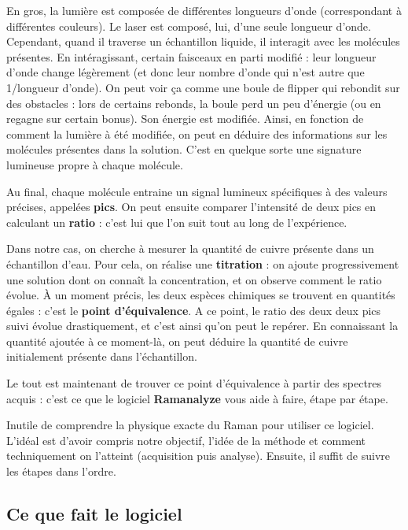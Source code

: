 \documentclass[12pt, a4paper]{article}
\begin{document}
En gros, la lumière est composée de différentes longueurs d'onde (correspondant à différentes couleurs).
Le laser est composé, lui,  d'une seule longueur d'onde. Cependant, quand il traverse un échantillon liquide, il interagit avec les molécules présentes.
En intéragissant, certain faisceaux en parti modifié : leur longueur d'onde change légèrement (et donc leur nombre d'onde qui n'est autre que 1/longueur d'onde).
On peut voir ça comme une boule de flipper qui rebondit sur des obstacles : lors de certains rebonds, la boule perd un peu d'énergie (ou en regagne sur certain bonus). Son énergie est modifiée. 
Ainsi, en fonction de comment la lumière à été modifiée, on peut en déduire des informations sur les molécules présentes dans la solution.
C'est en quelque sorte une signature lumineuse propre à chaque molécule.

Au final, chaque molécule entraine un signal lumineux spécifiques à des valeurs précises, appelées
\textbf{pics}. 
On peut ensuite comparer l'intensité de deux pics en calculant un
\textbf{ratio} : c'est lui que l'on suit tout au long de l'expérience.

Dans notre cas, on cherche à mesurer la quantité de cuivre présente dans
un échantillon d'eau. Pour cela, on réalise une \textbf{titration} : on
ajoute progressivement une solution dont on connaît la concentration, et on
observe comment le ratio évolue. À un moment précis, les deux espèces
chimiques se trouvent en quantités égales : c'est le \textbf{point
d'équivalence}. A ce point, le ratio des deux deux pics suivi évolue drastiquement, et c'est ainsi qu'on peut le repérer.
 En connaissant la quantité ajoutée à ce moment-là, on peut
déduire la quantité de cuivre initialement présente dans l'échantillon.

Le tout est maintenant de trouver ce point d'équivalence à partir des spectres acquis : c'est ce que le logiciel \textbf{Ramanalyze} vous aide à faire, étape par étape.

\begin{conseil}
  Inutile de comprendre la physique exacte du Raman pour utiliser ce logiciel.
  L'idéal est d'avoir compris notre objectif, l'idée de la méthode et comment techniquement on l'atteint (acquisition puis analyse).
  Ensuite, il suffit de suivre les étapes dans l'ordre.
\end{conseil}

\subsection{Ce que fait le logiciel}
\end{document}
